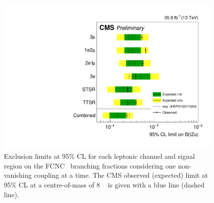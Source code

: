 \begin{figure}[htbp]
	\centering
	\includegraphics[width=0.7\linewidth]{6_Search/Figures/TOP-17-017_limitsZut.pdf}
	\caption{Exclusion limits at 95\% CL for each leptonic channel and signal region on the FCNC \Zut\ branching fractions considering one non-vanishing coupling at a time. The CMS observed (expected) limit at 95\% CL at a centre-of-mass of 8 \TeV~\cite{Sirunyan:2017kkr} is given with a blue line (dashed line).}	
	\label{fig:exclusionlimitbrcomp}
\end{figure}


